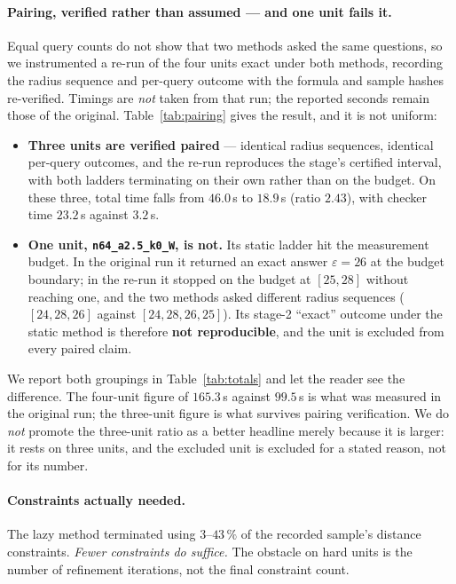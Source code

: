 \documentclass[11pt,a4paper]{article}
\theoremstyle{plain}
\theoremstyle{definition}
\theoremstyle{remark}
\begin{document}
\paragraph{Pairing, verified rather than assumed --- and one unit fails it.}
Equal query counts do not show that two methods asked the same questions, so we
instrumented a re-run of the four units exact under both methods, recording the
radius sequence and per-query outcome with the formula and sample hashes
re-verified. Timings are \emph{not} taken from that run; the reported seconds
remain those of the original. Table~\ref{tab:pairing} gives the result, and it is not uniform:

\begin{itemize}[nosep]
\item \textbf{Three units are verified paired} --- identical radius sequences,
      identical per-query outcomes, and the re-run reproduces the stage's
      certified interval, with both ladders terminating on their own rather than
      on the budget. On these three, total time falls from $46.0$\,s to
      $18.9$\,s (ratio $2.43$), with checker time $23.2$\,s against $3.2$\,s.
\item \textbf{One unit, \texttt{n64\_a2.5\_k0\_W}, is not.} Its static ladder hit
      the measurement budget. In the original run it returned an exact answer
      $\varepsilon = 26$ at the budget boundary; in the re-run it stopped on the
      budget at $[25,28]$ without reaching one, and the two methods asked
      different radius sequences ($[24,28,26]$ against $[24,28,26,25]$). Its
      stage-2 ``exact'' outcome under the static method is therefore
      \textbf{not reproducible}, and the unit is excluded from every paired
      claim.
\end{itemize}

We report both groupings in Table~\ref{tab:totals} and let the reader see the difference. The
four-unit figure of $165.3$\,s against $99.5$\,s is what was measured in the
original run; the three-unit figure is what survives pairing verification. We do
\emph{not} promote the three-unit ratio as a better headline merely because it is
larger: it rests on three units, and the excluded unit is excluded for a stated
reason, not for its number.

\paragraph{Constraints actually needed.} The lazy method terminated using
$3$--$43\,\%$ of the recorded sample's distance constraints. \emph{Fewer
constraints do suffice.} The obstacle on hard units is the number of refinement
iterations, not the final constraint count.
\end{document}
